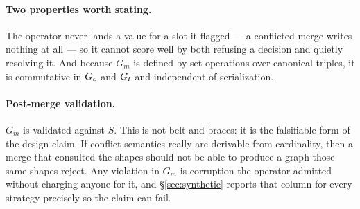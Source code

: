 \paragraph{Two properties worth stating.} The operator never lands a value for a
slot it flagged --- a conflicted merge writes nothing at all --- so it cannot
score well by both refusing a decision and quietly resolving it. And because
$G_m$ is defined by set operations over canonical triples, it is commutative in
$G_{o}$ and $G_{t}$ and independent of serialization.

\paragraph{Post-merge validation.} $G_m$ is validated against $S$. This is not
belt-and-braces: it is the falsifiable form of the design claim. If conflict
semantics really are derivable from cardinality, then a merge that consulted the
shapes should not be able to produce a graph those same shapes reject. Any
violation in $G_m$ is corruption the operator admitted without charging anyone
for it, and \S\ref{sec:synthetic} reports that column for every strategy
precisely so the claim can fail.
